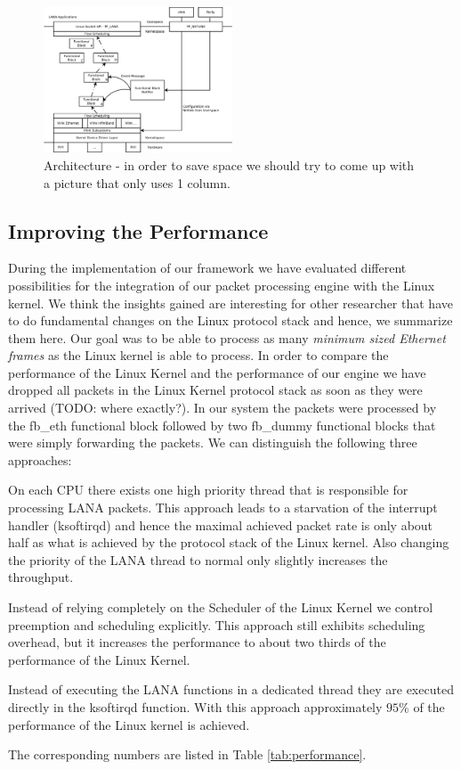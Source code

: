 \documentclass{sig-alternate}
\begin{document}
\begin{figure}
\centering
\includegraphics[width=0.5\textwidth]{figures/architecture.pdf}
\caption{Architecture - in order to save space we should try to come up with a picture that only uses 1 column.}
\label{fig:architecture}

\end{figure}

\subsection{Improving the Performance}
During the implementation of our framework we have evaluated different possibilities for the integration of our packet processing engine with the Linux kernel. We think the insights gained are interesting for other researcher that have to do fundamental changes on the Linux protocol stack and hence, we summarize them here. 
Our goal was to be able to process as many \textit{minimum sized Ethernet frames} as the Linux kernel is able to process. In order to compare the performance of the Linux Kernel and the performance of our engine we have dropped all packets in the Linux Kernel protocol stack as soon as they were arrived (TODO: where exactly?). In our system the packets were processed by the fb\_eth functional block followed by two fb\_dummy functional blocks that were simply forwarding the packets. We can distinguish the following three approaches:
\begin{compactitem}
\item On each CPU there exists one high priority thread that is responsible for processing LANA packets. This approach leads to a starvation of the interrupt handler (ksoftirqd) and hence the maximal achieved packet rate is only about half as what is achieved by the protocol stack of the Linux kernel. Also changing the priority of the LANA thread to normal only slightly increases the throughput.
\item Instead of relying completely on the Scheduler of the Linux Kernel we control preemption and scheduling explicitly. This approach still exhibits scheduling overhead, but it increases the performance to about two thirds of the performance of the Linux Kernel. 
\item Instead of executing the LANA functions in a dedicated thread they are executed directly in the ksoftirqd function. With this approach approximately $95\%$ of the performance of the Linux kernel is achieved.
\end{compactitem}
The corresponding numbers are listed in Table \ref{tab:performance}.
\end{document}
